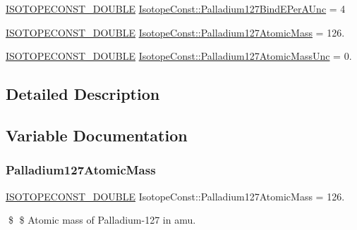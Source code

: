 \begin{DoxyCompactItemize}
\mbox{\hyperlink{group___isotope_const-_macros_ga8f45a7272ce02c0b4c65c44636ed719a}{I\+S\+O\+T\+O\+P\+E\+C\+O\+N\+S\+T\+\_\+\+D\+O\+U\+B\+LE}} \mbox{\hyperlink{group___isotope_const-_palladium-_pd127_ga7658a8337543bd946a610f29e26b1da3}{Isotope\+Const\+::\+Palladium127\+Bind\+E\+Per\+A\+Unc}} = 4
\item 
\mbox{\hyperlink{group___isotope_const-_macros_ga8f45a7272ce02c0b4c65c44636ed719a}{I\+S\+O\+T\+O\+P\+E\+C\+O\+N\+S\+T\+\_\+\+D\+O\+U\+B\+LE}} \mbox{\hyperlink{group___isotope_const-_palladium-_pd127_ga8e8d8a6bdc2ed7a3a7a27f17dd9f313e}{Isotope\+Const\+::\+Palladium127\+Atomic\+Mass}} = 126.
\item 
\mbox{\hyperlink{group___isotope_const-_macros_ga8f45a7272ce02c0b4c65c44636ed719a}{I\+S\+O\+T\+O\+P\+E\+C\+O\+N\+S\+T\+\_\+\+D\+O\+U\+B\+LE}} \mbox{\hyperlink{group___isotope_const-_palladium-_pd127_gaccc3cc27631253ba83f1ed6cf9cf5341}{Isotope\+Const\+::\+Palladium127\+Atomic\+Mass\+Unc}} = 0.
\end{DoxyCompactItemize}


\subsection{Detailed Description}


\subsection{Variable Documentation}
\mbox{\label{group___isotope_const-_palladium-_pd127_ga8e8d8a6bdc2ed7a3a7a27f17dd9f313e}} 
\subsubsection{\texorpdfstring{Palladium127\+Atomic\+Mass}{Palladium127AtomicMass}}
{\footnotesize\ttfamily \mbox{\hyperlink{group___isotope_const-_macros_ga8f45a7272ce02c0b4c65c44636ed719a}{I\+S\+O\+T\+O\+P\+E\+C\+O\+N\+S\+T\+\_\+\+D\+O\+U\+B\+LE}} Isotope\+Const\+::\+Palladium127\+Atomic\+Mass = 126.}

\$ \$ Atomic mass of Palladium-\/127 in amu. \mbox{\label{group___isotope_const-_palladium-_pd127_gaccc3cc27631253ba83f1ed6cf9cf5341}} 
